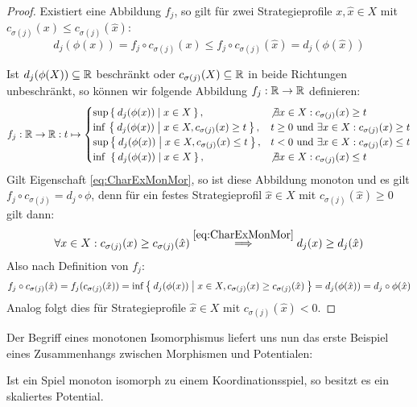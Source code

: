 \begin{proof}
	Existiert eine Abbildung $f_j$, so gilt für zwei Strategieprofile $x, \hat{x} \in X$ mit $c_{\sigma(j)}(x) \leq c_{\sigma(j)}(\hat{x})$:
		\[d_j(\phi(x)) = f_j\circ c_{\sigma(j)}(x) \leq f_j\circ c_{\sigma(j)}(\hat{x}) = d_j(\phi(\hat{x}))\]
		
	Ist $d_j(\phi(X)) \subseteq \mathbb{R}$ beschränkt oder $c_{\sigma(j)}(X) \subseteq \mathbb{R}$ in beide Richtungen unbeschränkt, so können wir folgende Abbildung $f_j: \mathbb{R} \to \mathbb{R}$ definieren:
		\[f_j: \mathbb{R} \to \mathbb{R}: t \mapsto \begin{cases}
			\sup \Set{d_j(\phi(x)) | x \in X},								&\not\exists x \in X: c_{\sigma(j)}(x) \geq t \\
			\inf\, \Set{d_j(\phi(x)) | x \in X, c_{\sigma(j)}(x) \geq t}, 	&t \geq 0 \text{ und } \exists x \in X: c_{\sigma(j)}(x) \geq t\\
			\sup \Set{d_j(\phi(x)) | x \in X, c_{\sigma(j)}(x) \leq t}, 	&t <    0 \text{ und } \exists x \in X: c_{\sigma(j)}(x) \leq t\\
			\inf\,\, \Set{d_j(\phi(x)) | x \in X},							&\not\exists x \in X: c_{\sigma(j)}(x) \leq t 
		\end{cases} \]
	Gilt Eigenschaft \eqref{eq:CharExMonMor}, so ist diese Abbildung monoton und es gilt $f_j\circ c_{\sigma(j)} = d_j \circ \phi$, denn für ein festes Strategieprofil $\hat{x} \in X$ mit $c_{\sigma(j)}(\hat{x}) \geq 0$ gilt dann:
		\[\forall x \in X: c_{\sigma(j)}(x) \geq c_{\sigma(j)}(\hat{x}) \overset{\eqref{eq:CharExMonMor}}{\implies} d_j(x) \geq d_j(\hat{x}) \]
	Also nach Definition von $f_j$:
		\[f_j \circ c_{\sigma(j)}(\hat{x}) = f_j (c_{\sigma(j)}(\hat{x})) = \inf\Set{d_j(\phi(x)) | x \in X, c_{\sigma(j)}(x) \geq c_{\sigma(j)}(\hat{x}) }= d_j(\phi(\hat{x})) = d_j\circ \phi(\hat{x})\]
	Analog folgt dies für Strategieprofile $\hat{x} \in X$ mit $c_{\sigma(j)}(\hat{x}) < 0$.
\end{proof}

Der Begriff eines monotonen Isomorphismus liefert uns nun das erste Beispiel eines Zusammenhangs zwischen Morphismen und Potentialen:

\begin{prop}\label{prop:MonIsoKoordDannskPot}
	Ist ein Spiel monoton isomorph zu einem Koordinationsspiel, so besitzt es ein skaliertes Potential.
\end{prop}

